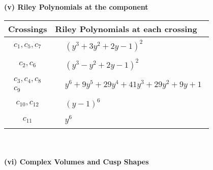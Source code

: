 \documentclass[1p]{elsarticle_modified}
\theoremstyle{definition}
\begin{document}
\newpage\renewcommand{\arraystretch}{1}
\flushleft \textbf{(v) Riley Polynomials at the component}\newline \\
\begin{tabular}{m{50pt}|m{274pt}}
Crossings & \hspace{64pt}Riley Polynomials at each crossing \\
\hline $$\begin{aligned}c_{1},c_{5},c_{7}\end{aligned}$$&$\begin{aligned}
&(y^3+3 y^2+2 y-1)^2
\end{aligned}$\\
\hline $$\begin{aligned}c_{2},c_{6}\end{aligned}$$&$\begin{aligned}
&(y^3- y^2+2 y-1)^2
\end{aligned}$\\
\hline $$\begin{aligned}c_{3},c_{4},c_{8}\\c_{9}\end{aligned}$$&$\begin{aligned}
&y^6+9 y^5+29 y^4+41 y^3+29 y^2+9 y+1
\end{aligned}$\\
\hline $$\begin{aligned}c_{10},c_{12}\end{aligned}$$&$\begin{aligned}
&(y-1)^6
\end{aligned}$\\
\hline $$\begin{aligned}c_{11}\end{aligned}$$&$\begin{aligned}
&y^6
\end{aligned}$\\
\hline
\end{tabular}\\~\\
\newpage\flushleft \textbf{(vi) Complex Volumes and Cusp Shapes}
\end{document}
